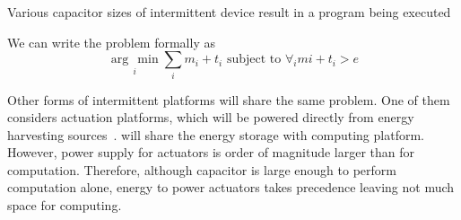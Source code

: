 Various capacitor sizes of intermittent device result in a program being executed 

We can write the problem formally as
%
\begin{equation}
\underset{i}{\arg\,\min} \sum_{i}m_i+t_i \text{~subject to~} \forall_i mi+t_i>e
\end{equation}

Other forms of intermittent platforms will share the same problem. One of them considers actuation platforms, which will be powered directly from energy harvesting sources~\cite{}. will share the energy storage with computing platform. However, power supply for actuators is order of magnitude larger than for computation. Therefore, although capacitor is large enough to perform computation alone, energy to power actuators takes precedence leaving not much space for computing.


